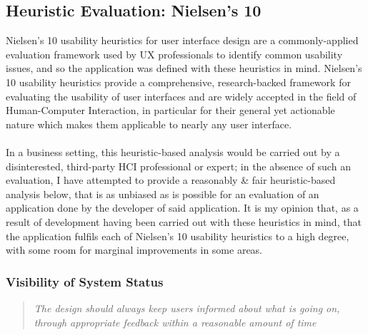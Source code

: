 \documentclass[a4paper,11pt]{report}
\begin{document}
\subsection{Heuristic Evaluation: Nielsen's 10}
Nielsen's 10 usability heuristics for user interface\supercite{nielsenheuristics} design are a commonly-applied evaluation framework used by UX professionals to identify common usability issues, and so the application was defined with these heuristics in mind.
Nielsen's 10 usability heuristics provide a comprehensive, research-backed framework for evaluating the usability of user interfaces and are widely accepted in the field of Human-Computer Interaction, in particular for their general yet actionable nature which makes them applicable to nearly any user interface.
\\\\
In a business setting, this heuristic-based analysis would be carried out by a disinterested, third-party HCI professional or expert;
in the absence of such an evaluation, I have attempted to provide a reasonably \& fair heuristic-based analysis below, that is as unbiased as is possible for an evaluation of an application done by the developer of said application.
It is my opinion that, as a result of development having been carried out with these heuristics in mind, that the application fulfils each of Nielsen's 10 usability heuristics to a high degree, with some room for marginal improvements in some areas.

\subsubsection{Visibility of System Status}
\begin{quote}
    \textit{The design should always keep users informed about what is going on, through appropriate feedback within a reasonable amount of time}
\end{quote}
\end{document}
